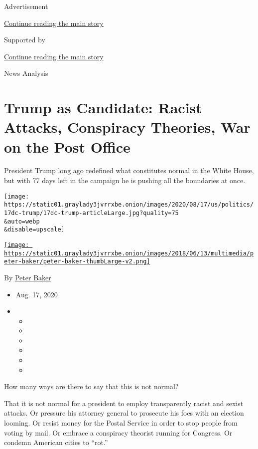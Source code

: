 Advertisement

\protect\hyperlink{after-top}{Continue reading the main story}

Supported by

\protect\hyperlink{after-sponsor}{Continue reading the main story}

News Analysis

\hypertarget{trump-as-candidate-racist-attacks-conspiracy-theories-war-on-the-post-office}{%
\section{Trump as Candidate: Racist Attacks, Conspiracy Theories, War on
the Post
Office}\label{trump-as-candidate-racist-attacks-conspiracy-theories-war-on-the-post-office}}

President Trump long ago redefined what constitutes normal in the White
House, but with 77 days left in the campaign he is pushing all the
boundaries at once.

\texttt{[image: https://static01.graylady3jvrrxbe.onion/images/2020/08/17/us/politics/17dc-trump/17dc-trump-articleLarge.jpg?quality=75\\\&auto=webp\\\&disable=upscale]}

\href{https://www.nytimes3xbfgragh.onion/by/peter-baker}{\texttt{[image: https://static01.graylady3jvrrxbe.onion/images/2018/06/13/multimedia/peter-baker/peter-baker-thumbLarge-v2.png]}}

By \href{https://www.nytimes3xbfgragh.onion/by/peter-baker}{Peter Baker}

\begin{itemize}
\item
  Aug. 17, 2020
\item
  \begin{itemize}
  \item
  \item
  \item
  \item
  \item
  \item
  \end{itemize}
\end{itemize}

How many ways are there to say that this is not normal?

That it is not normal for a president to employ transparently racist and
sexist attacks. Or pressure his attorney general to prosecute his foes
with an election looming. Or resist money for the Postal Service in
order to stop people from voting by mail. Or embrace a conspiracy
theorist running for Congress. Or condemn American cities to ``rot.''

